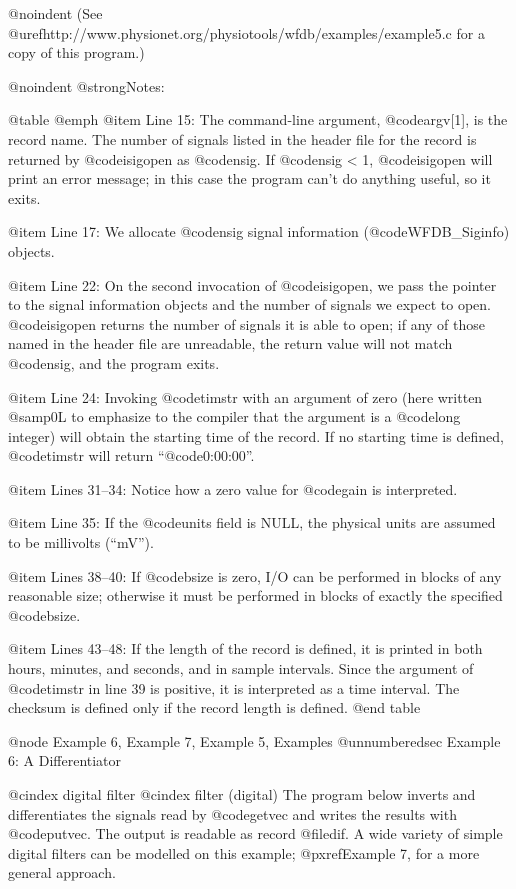 {{{{{{{{{{@noindent
(See @uref{http://www.physionet.org/physiotools/wfdb/examples/example5.c}
for a copy of this program.)

@noindent
@strong{Notes:}

@table @emph
@item Line 15:
The command-line argument, @code{argv[1]}, is the record name.  The
number of signals listed in the header file for the record is returned by
@code{isigopen} as @code{nsig}.  If @code{nsig} < 1, @code{isigopen} will
print an error message; in this case the program can't do anything useful,
so it exits.

@item Line 17:
We allocate @code{nsig} signal information (@code{WFDB_Siginfo}) objects.

@item Line 22:
On the second invocation of @code{isigopen}, we pass the pointer to the
signal information objects and the number of signals we expect to open.
@code{isigopen} returns the number of signals it is able to open;  if
any of those named in the header file are unreadable, the return value
will not match @code{nsig}, and the program exits.

@item Line 24:
Invoking @code{timstr} with an argument of zero (here written @samp{0L}
to emphasize to the compiler that the argument is a @code{long} integer)
will obtain the starting time of the record.  If no starting time is
defined, @code{timstr} will return ``@code{0:00:00}''.

@item Lines 31--34:
Notice how a zero value for @code{gain} is interpreted.

@item Line 35:
If the @code{units} field is NULL, the physical units are assumed to be
millivolts (``mV'').

@item Lines 38--40:
If @code{bsize} is zero, I/O can be performed in blocks of any reasonable
size;  otherwise it must be performed in blocks of exactly the specified
@code{bsize}.

@item Lines 43--48:
If the length of the record is defined, it is printed in both hours,
minutes, and seconds, and in sample intervals.  Since the argument of
@code{timstr} in line 39 is positive, it is interpreted as a time
interval.  The checksum is defined only if the record length is
defined.
@end table

@node     Example 6, Example 7, Example 5, Examples
@unnumberedsec Example 6: A Differentiator

@cindex digital filter
@cindex filter (digital)
The program below inverts and differentiates the signals read by
@code{getvec} and writes the results with @code{putvec}.  The output is
readable as record @file{dif}.  A wide variety of simple digital filters
can be modelled on this example; @pxref{Example 7}, for a more general
approach.

}}}}}}}}}}
